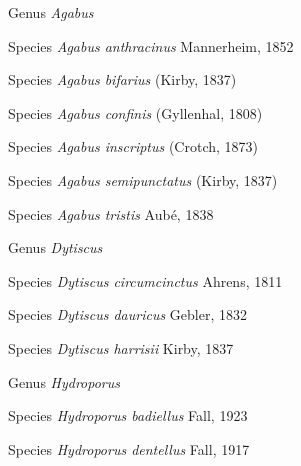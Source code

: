 \documentclass[9pt, article]{memoir}
\begin{document}
\begin{multicols}{2}
\vspace{6pt}\noindent\hspace{30pt}Genus \textit{Agabus}


\vspace{6pt}\noindent\hspace{36pt}Species \textit{Agabus anthracinus} Mannerheim, 1852


\vspace{6pt}\noindent\hspace{36pt}Species \textit{Agabus bifarius} (Kirby, 1837)


\vspace{6pt}\noindent\hspace{36pt}Species \textit{Agabus confinis} (Gyllenhal, 1808)


\vspace{6pt}\noindent\hspace{36pt}Species \textit{Agabus inscriptus} (Crotch, 1873)


\vspace{6pt}\noindent\hspace{36pt}Species \textit{Agabus semipunctatus} (Kirby, 1837)


\vspace{6pt}\noindent\hspace{36pt}Species \textit{Agabus tristis} Aubé, 1838


\vspace{6pt}\noindent\hspace{30pt}Genus \textit{Dytiscus}


\vspace{6pt}\noindent\hspace{36pt}Species \textit{Dytiscus circumcinctus} Ahrens, 1811


\vspace{6pt}\noindent\hspace{36pt}Species \textit{Dytiscus dauricus} Gebler, 1832


\vspace{6pt}\noindent\hspace{36pt}Species \textit{Dytiscus harrisii} Kirby, 1837


\vspace{6pt}\noindent\hspace{30pt}Genus \textit{Hydroporus}


\vspace{6pt}\noindent\hspace{36pt}Species \textit{Hydroporus badiellus} Fall, 1923


\vspace{6pt}\noindent\hspace{36pt}Species \textit{Hydroporus dentellus} Fall, 1917



\end{multicols}
\end{document}
